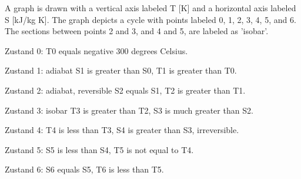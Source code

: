 A graph is drawn with a vertical axis labeled T [K] and a horizontal axis labeled S [kJ/kg K]. The graph depicts a cycle with points labeled 0, 1, 2, 3, 4, 5, and 6. The sections between points 2 and 3, and 4 and 5, are labeled as 'isobar'.

Zustand 0:
T0 equals negative 300 degrees Celsius.

Zustand 1:
adiabat
S1 is greater than S0, T1 is greater than T0.

Zustand 2:
adiabat, reversible
S2 equals S1, T2 is greater than T1.

Zustand 3:
isobar
T3 is greater than T2, S3 is much greater than S2.

Zustand 4:
T4 is less than T3, S4 is greater than S3, irreversible.

Zustand 5:
S5 is less than S4, T5 is not equal to T4.

Zustand 6:
S6 equals S5, T6 is less than T5.